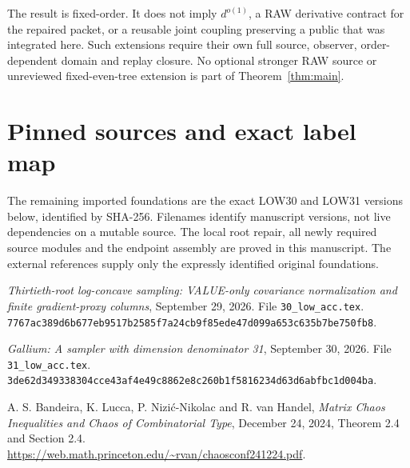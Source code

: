 \documentclass[11pt]{article}
\numberwithin{equation}{section}
\theoremstyle{remark}\newtheorem{remark}[theorem]{Remark}
\newcommand{\src}[1]{\texttt{\nolinkurl{#1}}}
\begin{document}
The result is fixed-order. It does not imply $d^{o(1)}$, a RAW derivative contract for the repaired packet, or a reusable joint coupling preserving a public that was integrated here. Such extensions require their own full source, observer, order-dependent domain and replay closure. No optional stronger RAW source or unreviewed fixed-even-tree extension is part of Theorem~\ref{thm:main}.

\appendix
\section{Pinned sources and exact label map}
\label{app:sources}
The remaining imported foundations are the exact LOW30 and LOW31 versions below, identified by SHA-256. Filenames identify manuscript versions, not live dependencies on a mutable source. The local root repair, all newly required source modules and the endpoint assembly are proved in this manuscript. The external references supply only the expressly identified original foundations.

\begin{description}[style=nextline,leftmargin=1.2cm]\raggedright
\item[{[30]}] \emph{Thirtieth-root log-concave sampling: VALUE-only covariance normalization and finite gradient-proxy columns}, September 29, 2026. File \src{30_low_acc.tex}.\\
\src{7767ac389d6b677eb9517b2585f7a24cb9f85ede47d099a653c635b7be750fb8}.
\item[{[31]}] \emph{Gallium: A sampler with dimension denominator 31}, September 30, 2026. File \mbox{\src{31_low_acc.tex}}.\\
\src{3de62d349338304cce43af4e49c8862e8c260b1f5816234d63d6abfbc1d004ba}.
\item[{[MC]}] A. S. Bandeira, K. Lucca, P. Nizi\'c-Nikolac and R. van Handel, \emph{Matrix Chaos Inequalities and Chaos of Combinatorial Type}, December 24, 2024, Theorem 2.4 and Section 2.4.\\
\url{https://web.math.princeton.edu/~rvan/chaosconf241224.pdf}.
\end{description}
\end{document}

